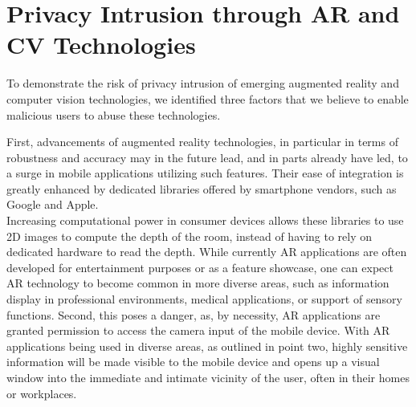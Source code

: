 
\section{Privacy Intrusion through AR and CV Technologies}

To demonstrate the risk of privacy intrusion of emerging augmented reality and computer vision technologies, we identified three factors that we believe to enable malicious users to abuse these technologies.

First, advancements of augmented reality technologies, in particular in terms of robustness and accuracy may in the future lead, and in parts already have led, to a surge in mobile applications utilizing such features. \autocite{HCI-049}
Their ease of integration is greatly enhanced by dedicated libraries offered by smartphone vendors, such as Google and Apple.\\
Increasing computational power in consumer devices allows these libraries to use 2D images to compute the depth of the room, instead of having to rely on dedicated hardware to read the depth.
While currently AR applications are often developed for entertainment purposes or as a feature showcase, one can expect AR technology to become common in more diverse areas, such as information display in professional environments, medical applications, or support of sensory functions.
Second, this poses a danger, as, by necessity, AR applications are granted permission to access the camera input of the mobile device.
With AR applications being used in diverse areas, as outlined in point two, highly sensitive information will be made visible to the mobile device and opens up a visual window into the immediate and intimate vicinity of the user, often in their homes or workplaces.\\

